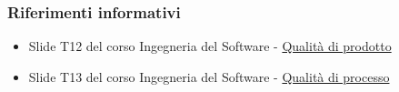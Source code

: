 \subsubsection{Riferimenti informativi}
\begin{itemize}
    \item Slide T12 del corso Ingegneria del Software -  \href{https://www.math.unipd.it/~tullio/IS-1/2021/Dispense/T12.pdf}{Qualità di prodotto}
    \item Slide T13 del corso Ingegneria del Software - \href{https://www.math.unipd.it/~tullio/IS-1/2021/Dispense/T13.pdf}{Qualità di processo}  
\end{itemize}
\newpage